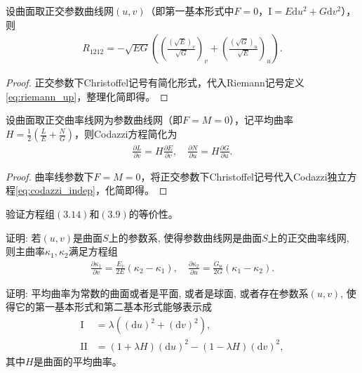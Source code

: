 \documentclass[../../main.tex]{subfiles}%
\begin{document}
\begin{proposition}
设曲面取正交参数曲线网$(u,v)$（即第一基本形式中$F=0$，$\mathrm{I}=E\mathrm{d}u^2+G\mathrm{d}v^2$），则
\begin{align*}
R_{1212} = -\sqrt{EG}\left(\left(\frac{(\sqrt{E})_v}{\sqrt{G}}\right)_v+\left(\frac{(\sqrt{G})_u}{\sqrt{E}}\right)_u\right).
\end{align*}
\end{proposition}

\begin{proof}

正交参数下Christoffel记号有简化形式，代入Riemann记号定义\eqref{eq:riemann_up}，整理化简即得。

\end{proof}

\begin{proposition}
设曲面取正交曲率线网为参数曲线网（即$F=M=0$），记平均曲率$H=\frac{1}{2}\left(\frac{L}{E}+\frac{N}{G}\right)$，则Codazzi方程简化为
\begin{align*}
\frac{\partial L}{\partial v}=H\frac{\partial E}{\partial v},\quad \frac{\partial N}{\partial u}=H\frac{\partial G}{\partial u}.
\end{align*}
\end{proposition}
\begin{proof}

曲率线参数下$F=M=0$，将正交参数下Christoffel记号代入Codazzi独立方程\eqref{eq:codazzi_indep}，化简即得。

\end{proof}

\begin{example}
验证方程组$(3.14)$和$(3.9)$的等价性。
\end{example}

\begin{example}
证明: 若$(u,v)$是曲面$S$上的参数系, 使得参数曲线网是曲面$S$上的正交曲率线网, 则主曲率$\kappa_1,\kappa_2$满足方程组
\begin{align*}
\frac{\partial \kappa_1}{\partial v} = \frac{E_v}{2E}(\kappa_2 - \kappa_1),\quad \frac{\partial \kappa_2}{\partial u} = \frac{G_u}{2G}(\kappa_1 - \kappa_2).
\end{align*}
\end{example}

\begin{example}
证明: 平均曲率为常数的曲面或者是平面, 或者是球面, 或者存在参数系$(u,v)$, 使得它的第一基本形式和第二基本形式能够表示成
\begin{align*}
\mathrm{I} &= \lambda\left((\mathrm{d}u)^2 + (\mathrm{d}v)^2\right),\\
\mathrm{II} &= (1+\lambda H)(\mathrm{d}u)^2 - (1-\lambda H)(\mathrm{d}v)^2,
\end{align*}
其中$H$是曲面的平均曲率。
\end{example}
\end{document}

